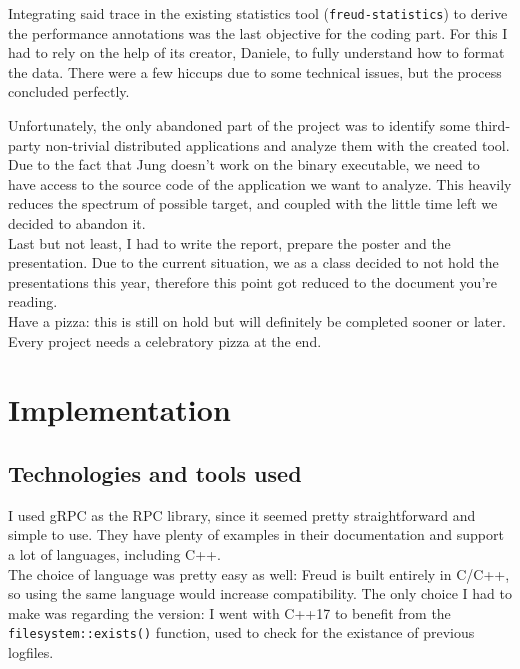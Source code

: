         Integrating said trace in the existing statistics tool (\texttt{freud-statistics}) to derive
        the performance annotations was the last objective for the coding part. For this I had to rely on the
        help of its creator, Daniele, to fully understand how to format the data. There were a few hiccups due to
        some technical issues, but the process concluded perfectly.

        Unfortunately, the only abandoned part of the project was to identify some third-party non-trivial
        distributed applications and analyze them with the created tool. Due to the fact that Jung doesn't work 
        on the binary executable, we need to have access to the source code of the application we want to 
        analyze. This heavily reduces the spectrum of possible target, and coupled with the little time left we
        decided to abandon it.\\

        Last but not least, I had to write the report, prepare the poster and the presentation. Due to the current
        situation, we as a class decided to not hold the presentations this year, therefore this point got reduced
        to the document you're reading.\\
        
        Have a pizza: this is still on hold but will definitely be completed sooner or later. Every project needs
        a celebratory pizza at the end.
        

\chapter{Implementation}
    
    \section{Technologies and tools used}

        I used gRPC \cite{gRPCdocs} as the RPC library, since it seemed pretty straightforward and simple
        to use. They have plenty of examples in their documentation and support a lot of languages, including C++.\\

        The choice of language was pretty easy as well: Freud is built entirely in C/C++, so using the same
        language would increase compatibility. The only choice I had to make was regarding the version:
        I went with C++17 to benefit from the \texttt{filesystem::exists()} function, used to check
        for the existance of previous logfiles.\\

